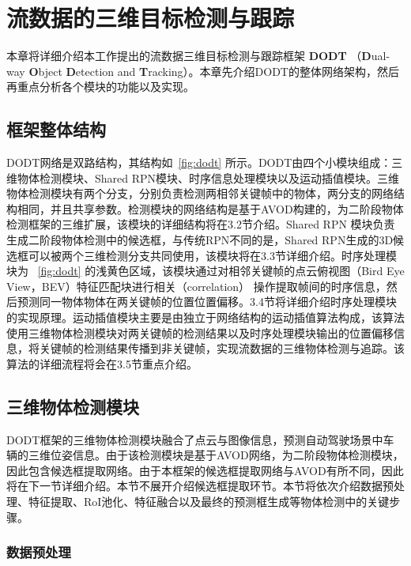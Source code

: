 
\chapter{流数据的三维目标检测与跟踪}
\label{methodology}
本章将详细介绍本工作提出的流数据三维目标检测与跟踪框架 \textbf{DODT} （\textbf{D}ual-way \textbf{O}bject \textbf{D}etection and \textbf{T}racking）。本章先介绍DODT的整体网络架构，然后再重点分析各个模块的功能以及实现。

\section{框架整体结构}
\label{total_structure}


DODT网络是双路结构，其结构如\figurename \, \ref{fig:dodt} 所示。DODT由四个小模块组成：三维物体检测模块、Shared RPN模块、时序信息处理模块以及运动插值模块。三维物体检测模块有两个分支，分别负责检测两相邻关键帧中的物体，两分支的网络结构相同，并且共享参数。检测模块的网络结构是基于AVOD\cite{ku2018joint}构建的，为二阶段物体检测框架的三维扩展，该模块的详细结构将在3.2节介绍。Shared RPN 模块负责生成二阶段物体检测中的候选框，与传统RPN不同的是，Shared RPN生成的3D候选框可以被两个三维检测分支共同使用，该模块将在3.3节详细介绍。时序处理模块为 \figurename \, \ref{fig:dodt} 的浅黄色区域，该模块通过对相邻关键帧的点云俯视图（Bird Eye View，BEV）特征匹配块进行相关（correlation） 操作提取帧间的时序信息，然后预测同一物体物体在两关键帧的位置位置偏移。3.4节将详细介绍时序处理模块的实现原理。运动插值模块主要是由独立于网络结构的运动插值算法构成，该算法使用三维物体检测模块对两关键帧的检测结果以及时序处理模块输出的位置偏移信息，将关键帧的检测结果传播到非关键帧，实现流数据的三维物体检测与追踪。该算法的详细流程将会在3.5节重点介绍。


\section{三维物体检测模块}
\label{3d_detection_module}

DODT框架的三维物体检测模块融合了点云与图像信息，预测自动驾驶场景中车辆的三维位姿信息。由于该检测模块是基于AVOD\cite{ku2018joint}网络，为二阶段物体检测模块，因此包含候选框提取网络。由于本框架的候选框提取网络与AVOD有所不同，因此将在下一节详细介绍。本节不展开介绍候选框提取环节。本节将依次介绍数据预处理、特征提取、RoI池化、特征融合以及最终的预测框生成等物体检测中的关键步骤。

\subsection{数据预处理}

